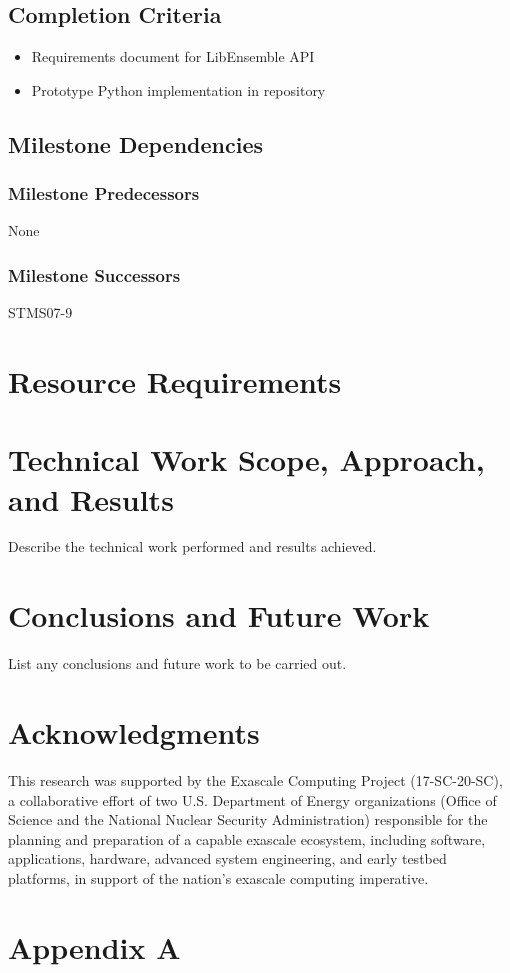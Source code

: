 \documentclass{ecpreport}
\begin{document}
\subsection{Completion Criteria}

\begin{itemize}
\item Requirements document for LibEnsemble API
\item Prototype Python implementation in repository
\end{itemize}

\subsection{Milestone Dependencies}
\subsubsection{Milestone Predecessors}

None

\subsubsection{Milestone Successors}

STMS07-9

\section{Resource Requirements}

\section{Technical Work Scope, Approach, and Results}

Describe the technical work performed and results achieved. 

\section{Conclusions and Future Work}

List any conclusions and future work to be carried out.

\section*{Acknowledgments}

This research was supported by the Exascale Computing Project (17-SC-20-SC), a collaborative 
effort of two U.S. Department of Energy organizations (Office of Science and the National 
Nuclear Security Administration) responsible for the planning and preparation of a 
capable exascale ecosystem, including software, applications, hardware, advanced 
system engineering, and early testbed platforms, in support of the nation’s 
exascale computing imperative.





\newpage
\appendix
\section{Appendix A}
\end{document}
